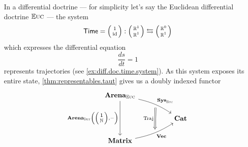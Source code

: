 \documentclass[DynamicalBook]{subfiles}
\begin{document}
\begin{example}\label{ex:trajectories.compositional.behavior}
In a differential doctrine --- for simplicity let's say the Euclidean
differential doctrine $\mathbb{E}\textsc{uc}$ --- the system
\[
\Sys{Time} = \lens{1}{\id} : \lens{\rr^1}{\rr^1} \fromto \lens{\rr^0}{\rr^1}
\]
which expresses the differential equation
$$\frac{ds}{dt} = 1$$
represents trajectories (see \cref{ex:diff.doc.time.system}). As this system
exposes its entire state, \cref{thm:representables.taut} gives us a doubly
indexed functor
\[
\begin{tikzcd}
	{\Cat{Arena}_{\eucdiff}} \\
	&& {\Cat{Cat}} \\
	{\Cat{Matrix}}
	\arrow[""{name=0, anchor=center, inner sep=0}, "{\Cat{Sys}_{\eucdiff}}", from=1-1,
  to=2-3, bend left = 10]
	\arrow[""{name=1, anchor=center, inner sep=0}, "{\Cat{Vec}}"', from=3-1,
  to=2-3, bend right = 10]
	\arrow["{\Cat{Arena}_{\determ}\left(\littlelens{\ord{1}}{\nn},-\right)}"', from=1-1, to=3-1]
	\arrow["{\Fun{Traj}}"', shorten <=4pt, shorten >=4pt, Rightarrow, from=0, to=1]
\end{tikzcd}
\]

\end{example}
\end{document}
